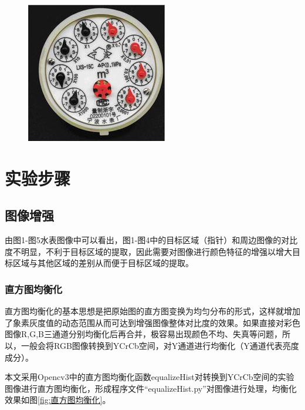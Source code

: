 \documentclass[a4paper]{ctexart}
\begin{document}
\begin{figure}[htbp]
\begin{minipage}[t]{0.25\textwidth}
		\includegraphics[width=\textwidth]{figure/img5.jpg}
		\caption{}\label{fig:5}
	\end{minipage}
\end{figure}

\section{实验步骤}
\subsection{图像增强}\label{sec:色彩增强}
由图1-图5水表图像中可以看出，图1-图4中的目标区域（指针）和周边图像的对比度不明显，不利于目标区域的提取，因此需要对图像进行颜色特征的增强以增大目标区域与其他区域的差别从而便于目标区域的提取。
\subsubsection{直方图均衡化}
直方图均衡化的基本思想是把原始图的直方图变换为均匀分布的形式，这样就增加了象素灰度值的动态范围从而可达到增强图像整体对比度的效果。如果直接对彩色图像R,G,B三通道分别均衡化后再合并，极容易出现颜色不均、失真等问题，所以，一般会将RGB图像转换到YCrCb空间，对Y通道进行均衡化（Y通道代表亮度成分）。

本文采用Opencv3中的直方图均衡化函数equalizeHist对转换到YCrCb空间的实验图像进行直方图均衡化，形成程序文件“equalizeHist.py”对图像进行处理，均衡化效果如图\ref{fig:直方图均衡化}。
\end{document}
